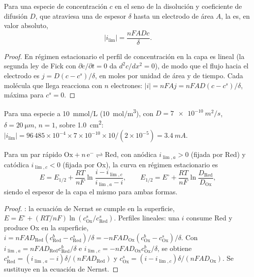 \begin{theorem}\label{thm:b2:current-potential-curves:limiting}
Para una especie de concentración $c$ en el seno de la disolución y coeficiente de difusión $D$,
que atraviesa una  de espesor $\delta$ hasta un electrodo de área $A$,
la  es, en valor absoluto,
\[
  |i_{\lim}| = \frac{nFADc}{\delta} .
\]
\end{theorem}

\begin{proof}
En régimen estacionario el perfil de concentración en la capa es lineal (la segunda ley
de Fick con $\partial c/\partial t = 0$ da $d^2c/dx^2 = 0$), de modo que el flujo
hacia el electrodo es $j = D(c - c^s)/\delta$, en moles por unidad de área y de
tiempo. Cada molécula que llega reacciona con $n$ electrones: $|i| = nFAj =
nFAD(c - c^s)/\delta$, máxima para $c^s = 0$.
\end{proof}

\begin{example}\label{ex:b2:current-potential-curves:ilim}
Para una especie a \qty{10}{mmol/L} (\qty{10}{mol/m^3}), con $D =
\qty{7e-10}{m^2/s}$, $\delta = \qty{20}{\micro m}$, $n = 1$, sobre
\qty{1.0}{cm^2}: $|i_{\lim}| = 96\,485 \times 10^{-4} \times 7 \times 10^{-10}
\times 10/(2 \times 10^{-5}) = \qty{3.4}{mA}$.
\end{example}

\begin{theorem}\label{thm:b2:current-potential-curves:wave}
Para un par rápido $\mathrm{Ox} + n\,\mathrm e^- \rightleftharpoons \mathrm{Red}$,
con  anódica $i_{\lim,a} > 0$ (fijada por Red) y 
catódica $i_{\lim,c} < 0$ (fijada por Ox), la curva en régimen estacionario es
\[
  E = E_{1/2} + \frac{RT}{nF}\ln\frac{i - i_{\lim,c}}{i_{\lim,a} - i},
  \qquad E_{1/2} = E^\circ + \frac{RT}{nF}\ln\frac{D_{\text{Red}}}{D_{\text{Ox}}} ,
\]
siendo el espesor de la capa el mismo para ambas formas.
\end{theorem}

\begin{proof}
: la ecuación de Nernst se cumple en la superficie, $E = E^\circ + (RT/nF)
\ln(c^s_{\text{Ox}}/c^s_{\text{Red}})$. Perfiles lineales: una  $i$
consume Red y produce Ox en la superficie, $i = nFAD_{\text{Red}}(c^b_{\text{Red}}
- c^s_{\text{Red}})/\delta = -nFAD_{\text{Ox}}(c^b_{\text{Ox}} - c^s_{\text{Ox}})/\delta$.
Con $i_{\lim,a} = nFAD_{\text{Red}}c^b_{\text{Red}}/\delta$ e $i_{\lim,c} =
-nFAD_{\text{Ox}}c^b_{\text{Ox}}/\delta$, se obtiene $c^s_{\text{Red}} = (i_{\lim,a} -
i)\delta/(nFAD_{\text{Red}})$ y $c^s_{\text{Ox}} = (i - i_{\lim,c})\delta/(nFAD_{\text{Ox}})$.
Se sustituye en la ecuación de Nernst.
\end{proof}

